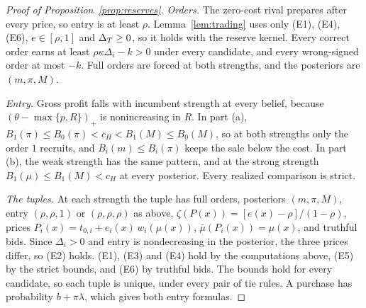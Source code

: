 \begin{proof}[Proof of Proposition~\ref{prop:reserves}]
\emph{Orders.} The zero-cost rival prepares after every price, so entry is at least \(\rho\). Lemma~\ref{lem:trading}
uses only (E1), (E4), (E6), \(e\in[\rho,1]\) and \(\Delta_T\ge0\), so it holds with the reserve kernel. Every correct order earns
at least \(\rho\kappa\Delta_i-k>0\) under every candidate, and every wrong-signed order at most \(-k\). Full orders are
forced at both strengths, and the posteriors are \((m,\pi,M)\).

\emph{Entry.} Gross profit falls with incumbent strength at every belief, because \((\theta-\max\{p,R\})_+\) is
nonincreasing in \(R\). In part (a), \(B_1(\pi)\le B_0(\pi)<c_H<B_1(M)\le B_0(M)\), so at both strengths only the
order \(1\) recruits, and \(B_i(m)\le B_i(\pi)\) keeps the sale below the cost. In part (b), the weak strength has
the same pattern, and at the strong strength \(B_1(\mu)\le B_1(M)<c_H\) at every posterior. Every realized comparison
is strict.

\emph{The tuples.} At each strength the tuple has full orders, posteriors \((m,\pi,M)\), entry \((\rho,\rho,1)\) or
\((\rho,\rho,\rho)\) as above, \(\zeta(P(x))=[e(x)-\rho]/(1-\rho)\), prices
\(P_i(x)=t_{0,i}+e_i(x)\,w_i(\mu(x))\), \(\bar\mu(P_i(x))=\mu(x)\), and truthful bids. Since \(\Delta_i>0\) and entry is
nondecreasing in the posterior, the three prices differ, so (E2) holds. (E1), (E3) and (E4) hold by the computations
above, (E5) by the strict bounds, and (E6) by truthful bids. The bounds hold for every candidate, so each tuple is
unique, under every pair of tie rules. A purchase has probability \(b+\pi\lambda\), which gives both entry formulas.
\end{proof}

